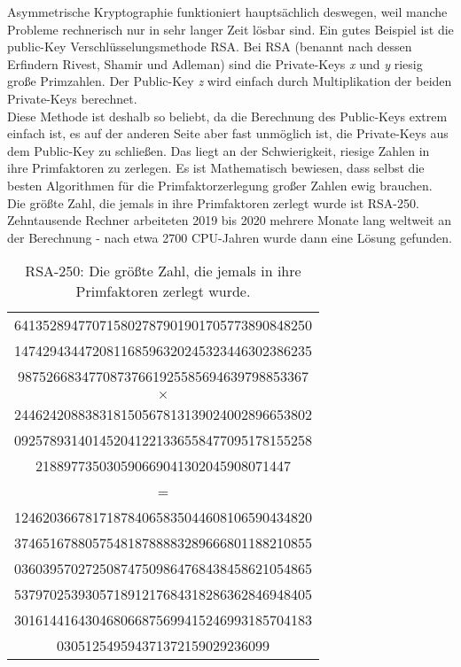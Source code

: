 \documentclass[12pt]{IEEEtran}
\begin{document}
Asymmetrische Kryptographie funktioniert hauptsächlich deswegen, weil manche Probleme rechnerisch nur in sehr langer Zeit lösbar sind. Ein gutes Beispiel ist die public-Key Verschlüsselungsmethode RSA. Bei RSA (benannt nach dessen Erfindern Rivest, Shamir und Adleman) sind die Private-Keys \textit{x} und \textit{y} riesig große Primzahlen. Der Public-Key \textit{z} wird einfach durch Multiplikation der beiden Private-Keys berechnet. \cite{mavroeidis2018impact} \\

Diese Methode ist deshalb so beliebt, da die Berechnung des Public-Keys extrem einfach ist, es auf der anderen Seite aber fast unmöglich ist, die Private-Keys aus dem Public-Key zu schließen. Das liegt an der Schwierigkeit, riesige Zahlen in ihre Primfaktoren zu zerlegen. Es ist Mathematisch bewiesen, dass selbst die besten Algorithmen für die Primfaktorzerlegung großer Zahlen ewig brauchen. \\

Die größte Zahl, die jemals in ihre Primfaktoren zerlegt wurde ist RSA-250. Zehntausende Rechner arbeiteten 2019 bis 2020 mehrere Monate lang weltweit an der Berechnung - nach etwa 2700 CPU-Jahren wurde dann eine Lösung gefunden. \cite{RSA250} \cite{RSANumbers}

\begin{table}
    \centering
    \caption{RSA-250: Die größte Zahl, die jemals in ihre Primfaktoren zerlegt wurde.}
    \label{tab:RSA-250}
    \begin{tabular}{c}
    641352894770715802787901901705773890848250\\
    147429434472081168596320245323446302386235\\
    98752668347708737661925585694639798853367\\
    \(\times\)    \\
    244624208838318150567813139024002896653802\\
    092578931401452041221336558477095178155258\\
    218897735030590669041302045908071447\\
    =   \\
    124620366781718784065835044608106590434820\\
    374651678805754818788883289666801188210855\\
    036039570272508747509864768438458621054865\\
    537970253930571891217684318286362846948405\\
    301614416430468066875699415246993185704183\\
    030512549594371372159029236099\\
    \end{tabular}
\end{table}
\end{document}
